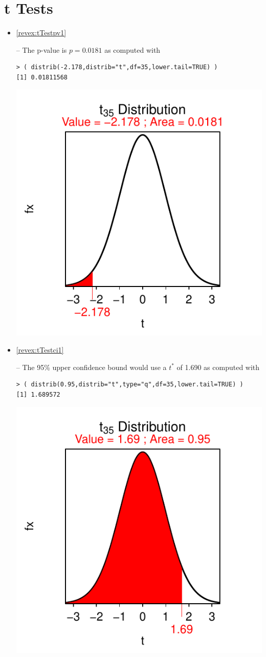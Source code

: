 \documentclass[10pt,openany]{book}\usepackage[]{graphicx}\usepackage[]{color}
\makeatletter
\newenvironment{kframe}{%
 \def\at@end@of@kframe{}%
 \ifinner\ifhmode%
  \def\at@end@of@kframe{\end{minipage}}%
  \begin{minipage}{\columnwidth}%
 \fi\fi%
 \def\FrameCommand##1{\hskip\@totalleftmargin \hskip-\fboxsep
 \colorbox{shadecolor}{##1}\hskip-\fboxsep
     \hskip-\linewidth \hskip-\@totalleftmargin \hskip\columnwidth}%
 \MakeFramed {\advance\hsize-\width
   \@totalleftmargin\z@ \linewidth\hsize
   \@setminipage}}%
 {\par\unskip\endMakeFramed%
 \at@end@of@kframe}
\newenvironment{knitrout}{}{} %
\makeatother
\begin{document}
\section*{t Tests}
\begin{itemize}
  \item \hypertarget{ans:tTestpv1}{\ref{revex:tTestpv1}} -- The p-value is $p=0.0181$ as computed with
\begin{knitrout}
\color{fgcolor}\begin{kframe}
\begin{verbatim}
> ( distrib(-2.178,distrib="t",df=35,lower.tail=TRUE) )
[1] 0.01811568
\end{verbatim}
\end{kframe}

{\centering \includegraphics[width=.4\linewidth]{Figs/unnamed-chunk-354-1} 

}



\end{knitrout}
  \item \hypertarget{ans:tTestci1}{\ref{revex:tTestci1}} -- The 95\% upper confidence bound would use a $t^{*}$ of 1.690 as computed with
\begin{knitrout}
\color{fgcolor}\begin{kframe}
\begin{verbatim}
> ( distrib(0.95,distrib="t",type="q",df=35,lower.tail=TRUE) )
[1] 1.689572
\end{verbatim}
\end{kframe}

{\centering \includegraphics[width=.4\linewidth]{Figs/unnamed-chunk-355-1} 

}
\end{knitrout}
\end{itemize}
\end{document}
